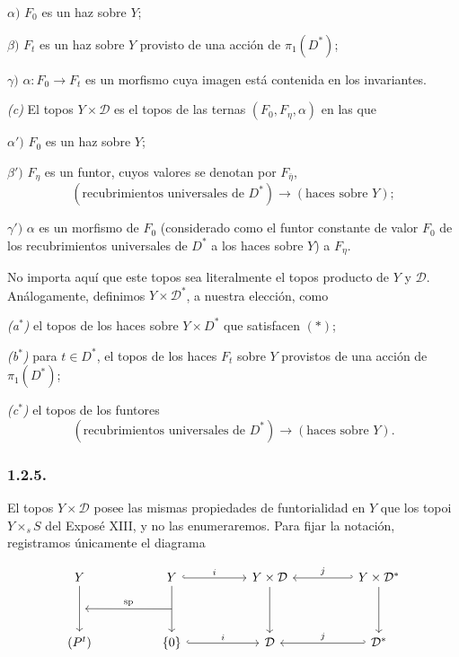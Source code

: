 \smallskip
\noindent $\alpha)$ $F_0$ es un haz sobre $Y$;

\noindent $\beta)$ $F_t$ es un haz sobre $Y$ provisto de una acción de
$\pi_1(D^*)$;

\noindent $\gamma)$ $\alpha:F_0\longrightarrow F_t$ es un morfismo cuya
imagen está contenida en los invariantes.

\medskip
\noindent\textit{(c)} El topos $Y\times\mathcal D$ es el topos de las ternas
$(F_0,F_\eta,\alpha)$ en las que

\smallskip
\noindent $\alpha')$ $F_0$ es un haz sobre $Y$;

\noindent $\beta')$ $F_\eta$ es un funtor, cuyos valores se denotan por
$F_{\bar\eta}$,
\[
(\text{recubrimientos universales de }D^*)
\longrightarrow(\text{haces sobre }Y);
\]

\noindent $\gamma')$ $\alpha$ es un morfismo de $F_0$ (considerado como el
funtor constante de valor $F_0$ de los recubrimientos universales de $D^*$ a
los haces sobre $Y$) a $F_\eta$.

No importa aquí que este topos sea literalmente el topos producto de $Y$ y
$\mathcal D$. Análogamente, definimos $Y\times\mathcal D^*$, a nuestra
elección, como

\medskip
\noindent\textit{(a$^*$)} el topos de los haces sobre $Y\times D^*$ que
satisfacen $(*)$;

\noindent\textit{(b$^*$)} para $t\in D^*$, el topos de los haces $F_t$ sobre
$Y$ provistos de una acción de $\pi_1(D^*)$;

\noindent\textit{(c$^*$)} el topos de los funtores
\[
(\text{recubrimientos universales de }D^*)
\longrightarrow(\text{haces sobre }Y).
\]

\subsubsection*{1.2.5.}
El topos $Y\times\mathcal D$ posee las mismas propiedades de funtorialidad en
$Y$ que los topoi $Y\times_s S$ del Exposé XIII, y no las enumeraremos. Para
fijar la notación, registramos únicamente el diagrama

\pageoriginale

\[
\begin{tikzcd}[row sep=huge, column sep=huge]
Y \arrow[d, ""{name=A}]
  & Y \arrow[d, ""{name=B}] \arrow[r, hook, "i"]
  & Y\times\mathcal D \arrow[d]
  & Y\times\mathcal D^* \arrow[d] \arrow[l, hook', "j"'] \\
(P^t)
  & \{0\} \arrow[r, hook, "i"]
  & \mathcal D
  & \mathcal D^* \arrow[l, hook', "j"']
    \arrow[from=B, to=A, "\mathrm{sp}"']
\end{tikzcd}
\]

